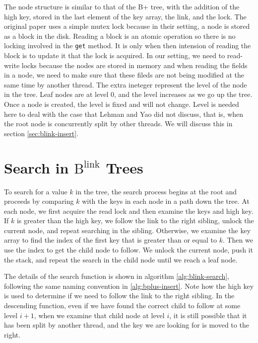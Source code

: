 \documentclass[11pt]{report}
\theoremstyle{definition}
\begin{document}
The node structure is similar to that of the B+ tree, with the addition of the high key, stored in the last element of the key array, the link, and the lock. The original paper uses a simple mutex lock because in their setting, a node is stored as a block in the disk. Reading a block is an atomic operation so there is no locking involved in the \texttt{get} method. It is only when then intension of reading the block is to update it that the lock is acquired. In our setting, we need to read-write locks because the nodes are stored in memory and when reading the fields in a node, we need to make sure that these fileds are not being modified at the same time by another thread. The extra ineteger represent the level of the node in the tree. Leaf nodes are at level 0, and the level increases as we go up the tree. Once a node is created, the level is fixed and will not change. Level is needed here to deal with the case that Lehman and Yao did not discuss, that is, when the root node is concurrently split by other threads. We will discuss this in section \ref{sec:blink-insert}.

\section{Search in $\text{B}^{\text{link}}$ Trees}
\label{sec:blink-search}

To search for a value $k$ in the tree, the search process begins at the root and proceeds by comparing $k$ with the keys in each node in a path down the tree. At each node, we first acquire the read lock and then examine the keys and high key. If $k$ is greater than the high key, we follow the link to the right sibling, unlock the current node, and repeat searching in the sibling. Otherwise, we examine the key array to find the index of the first key that is greater than or equal to $k$. Then we use the index to get the child node to follow. We unlock the current node, push it the stack, and repeat the search in the child node until we reach a leaf node.

The details of the search function is shown in algorithm \ref{alg:blink-search}, following the same naming convention in \ref{alg:bplus-insert}. Note how the high key is used to determine if we need to follow the link to the right sibling. In the descending function, even if we have found the correct child to follow at some level $i + 1$, when we examine that child node at level $i$, it is still possible that it has been split by another thread, and the key we are looking for is moved to the right.
\end{document}
